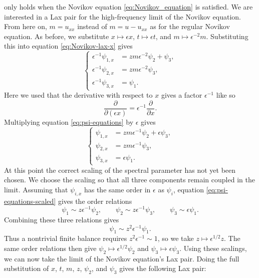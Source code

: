 \documentclass[english,master]{liumaiex}
\theoremstyle{thesisplain}
\theoremstyle{thesisdefinition}
\numberwithin{equation}{section}
\begin{document}
only holds when the Novikov equation \eqref{eq:Novikov_equation} is satisfied.
%
We are interested in a Lax pair for the high-frequency limit of the Novikov equation. From here on, $m = u_{xx}$ instead of $m = u - u_{xx}$ as for the regular Novikov equation. As before, we substitute $x \mapsto \epsilon x$, $t \mapsto \epsilon t$, and $m \mapsto \epsilon^{-2} m$. Substituting this into equation \eqref{eq:Novikov-lax-x} gives
\begin{equation} \label{eq:psi-equations}
\left\{ \begin{aligned}
	\epsilon^{-1}\psi_{1,x} &= zm \epsilon^{-2} \psi_2 + \psi_3, \\
	\epsilon^{-1}\psi_{2,x} &= zm \epsilon^{-2} \psi_3, \\
	\epsilon^{-1}\psi_{3,x} &= \psi_1.
\end{aligned} \right.
\end{equation}
Here we used that the derivative with respect to $x$ gives a factor $\epsilon^{-1}$ like so
\begin{equation}
	\frac{\partial}{\partial (\epsilon x)} = \epsilon^{-1} \frac{\partial}{\partial x}.
\end{equation}
Multiplying equation \eqref{eq:psi-equations} by $\epsilon$ gives
\begin{equation} \label{eq:psi-equations-scaled}
\left\{ \begin{aligned}
	\psi_{1,x} &= zm \epsilon^{-1} \psi_2 + \epsilon \psi_3, \\
	\psi_{2,x} &= zm \epsilon^{-1} \psi_3, \\
	\psi_{3,x} &= \epsilon \psi_1.
\end{aligned} \right.
\end{equation}
At this point the correct scaling of the spectral parameter has not yet been chosen. We choose the scaling so that all three components remain coupled in the limit. Assuming that $\psi_{i,x}$ has the same order in $\epsilon$ as $\psi_i$, equation \eqref{eq:psi-equations-scaled} gives the order relations
\begin{equation}
	\psi_1 \sim z\epsilon^{-1}\psi_2,\qquad
	\psi_2 \sim z\epsilon^{-1}\psi_3,\qquad
	\psi_3 \sim \epsilon\psi_1.
\end{equation}
Combining these three relations gives
\begin{equation}
	\psi_1 \sim z^2\epsilon^{-1}\psi_1.
\end{equation}
Thus a nontrivial finite balance requires $z^2\epsilon^{-1}\sim1$, so we take $z\mapsto\epsilon^{1/2}z$. The same order relations then give $\psi_2\mapsto\epsilon^{1/2}\psi_2$ and $\psi_3\mapsto\epsilon\psi_3$. Using these scalings, we can now take the limit of the Novikov equation's Lax pair. Doing the full substitution of $x$, $t$, $m$, $z$, $\psi_2$, and $\psi_3$ gives the following Lax pair:
\end{document}
